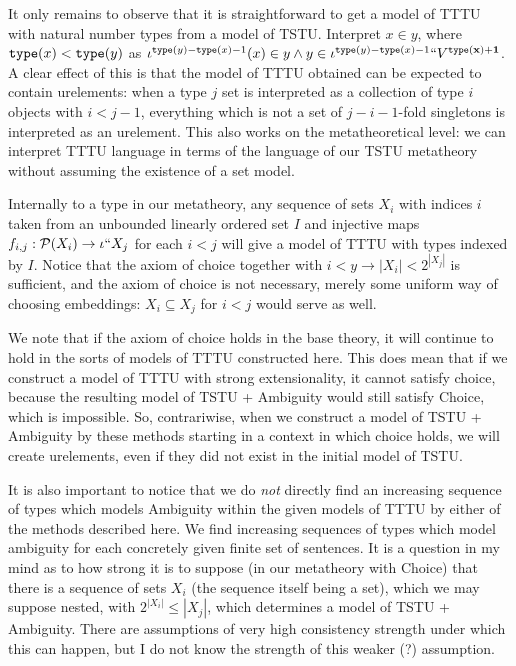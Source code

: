 \documentclass[12pt]{article}
\begin{document}
It only remains to observe that it is straightforward to get a model of TTTU with natural number types from a model of TSTU.  Interpret $x \in y$, where ${\tt type}(x) < {\tt type}(y)$ as $\iota^{{\tt type}(y)-{\tt type}(x)-1}(x) \in y \wedge y \in \iota^{{\tt type}(y)-{\tt type}(x)-1}``V^{\bf {\tt type}(x)+1}$.  A clear effect of this is that the model of TTTU obtained can be expected to contain urelements:  when a type $j$ set is interpreted as a collection of type $i$ objects
with $i<j-1$, everything which is not a set of $j-i-1$-fold singletons is interpreted as an urelement.   This also works on the metatheoretical level:  we can interpret TTTU language in terms of the language of our TSTU metatheory without assuming the existence of a set model.

Internally to a type in our metatheory,  any sequence of sets $X_i$ with indices $i$ taken from an unbounded  linearly ordered set $I$ and injective maps $f_{i,j}:{\cal P}(X_i) \rightarrow \iota``X_j$ for each $i<j$ will give a model of TTTU with types indexed by $I$.  Notice that the axiom of choice together with $i <y \rightarrow |X_i| < 2^{|X_j|}$ is sufficient, and the axiom of choice is not necessary, merely some uniform way of choosing embeddings:  $X_i \subseteq X_j$ for $i<j$ would serve as well.

We note that if the axiom of choice holds in the base theory, it will continue to hold in the sorts of models of TTTU constructed here.  This does mean that if we construct a model of TTTU with strong extensionality, it cannot satisfy choice, because the resulting model of TSTU + Ambiguity would still satisfy Choice, which is impossible.  So, contrariwise, when we construct a model of TSTU + Ambiguity by these methods starting in a context in which choice holds, we will create urelements, even if they did not exist in the initial model of TSTU.

It is also important to notice that we do {\em not\/} directly find an increasing sequence of types which models Ambiguity within the given models of TTTU by either of the methods described here.  We find increasing sequences of types which model ambiguity for each concretely given finite set of sentences.   It is a question in my mind as to how strong it is to suppose (in our metatheory with Choice) that there is a sequence of sets $X_i$ (the sequence itself being a set), which we may suppose nested,
with $2^{|X_i|} \leq |X_j|$, which determines a model of TSTU + Ambiguity.  There are assumptions of very high consistency strength under which this can happen, but I do not know the strength of this weaker (?)  assumption.
\end{document}
